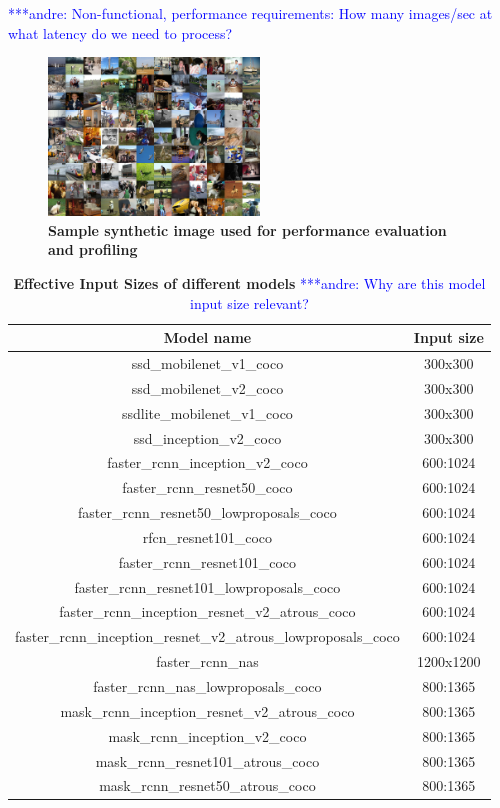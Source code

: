 \documentclass[conference]{IEEEtran}
\newcommand{\alnote}[1]{ {\textcolor{blue} { ***andre: #1 }}}
\newcommand{\alnote}[1]{}
\begin{document}
\alnote{Non-functional, performance requirements: How many images/sec at what latency do we need to process?}

\begin{figure}[htpb]
	  \centering
	  \includegraphics[width=0.5\textwidth]{sample_image}
	  \caption{\textbf{Sample synthetic image used for  performance evaluation and profiling}}
	  \label{fig:sample_image}
\end{figure}

\begin{table}
\caption{\textbf{Effective Input Sizes of different models}\alnote{Why are this model input size relevant?}}
\begin{tabular}{ c | c  }
Model name & Input size \\
\hline
ssd\_mobilenet\_v1\_coco & 300x300  \\
ssd\_mobilenet\_v2\_coco & 300x300  \\
ssdlite\_mobilenet\_v1\_coco & 300x300 \\
ssd\_inception\_v2\_coco & 300x300 \\
faster\_rcnn\_inception\_v2\_coco & 600:1024  \\
faster\_rcnn\_resnet50\_coco & 600:1024  \\
faster\_rcnn\_resnet50\_lowproposals\_coco & 600:1024 \\
rfcn\_resnet101\_coco & 600:1024\\
faster\_rcnn\_resnet101\_coco & 600:1024\\
faster\_rcnn\_resnet101\_lowproposals\_coco &  600:1024\\
faster\_rcnn\_inception\_resnet\_v2\_atrous\_coco	 &  600:1024\\
faster\_rcnn\_inception\_resnet\_v2\_atrous\_lowproposals\_coco & 600:1024\\
faster\_rcnn\_nas	&  1200x1200\\
faster\_rcnn\_nas\_lowproposals\_coco &  800:1365\\
mask\_rcnn\_inception\_resnet\_v2\_atrous\_coco & 800:1365 \\
mask\_rcnn\_inception\_v2\_coco	&  800:1365\\
mask\_rcnn\_resnet101\_atrous\_coco	&  800:1365\\
mask\_rcnn\_resnet50\_atrous\_coco &  800:1365\\
\end{tabular}
\label{tab:model_input_size}
\end{table}
\end{document}
